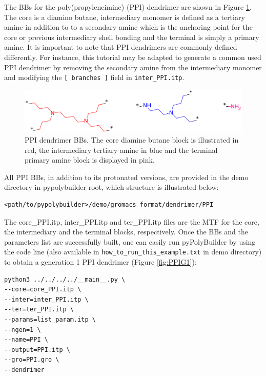 
The BBs for the poly(propyleneimine) (PPI) dendrimer are shown in Figure \ref{fig:PPIBB}.
The core is a diamino butane, intermediary monomer is defined as a tertiary amine in addition to to a secondary amine which is the anchoring point for the core or previous intermediary shell bonding and the terminal is simply a primary amine.
It is important to note that PPI dendrimers are commonly defined differently.
For instance, this tutorial may be adapted to generate a common used PPI dendrimer by removing the secondary amine from the intermediary monomer and modifying the \texttt{[ branches ]} field in \texttt{inter\_PPI.itp}.

\begin{figure}
    \centering
    \includegraphics[width=\textwidth]{PPI/PPIBBs.png}
    \caption{PPI dendrimer BBs.
             The core diamine butane block is illustrated in red, the intermediary tertiary amine in blue and the terminal primary amine block is displayed in pink.}
    \label{fig:PPIBB}
\end{figure}

All PPI BBs, in addition to its protonated versions, are provided in the demo directory in pypolybuilder root, which structure is illustrated below:
\begin{lstlisting}
<path/to/pypolybuilder>/demo/gromacs_format/dendrimer/PPI
\end{lstlisting}

The core\_PPI.itp, inter\_PPI.itp and ter\_PPI.itp files are the MTF for the core, the intermediary and the terminal blocks, respectively.
Once the BBs and the parameters list are successfully built, one can easily run pyPolyBuilder by using the code line (also available in \texttt{how\_to\_run\_this\_example.txt} in demo directory) to obtain a generation 1 PPI dendrimer (Figure \ref{fig:PPIG1}):

\begin{lstlisting}
python3 ../../../../__main__.py \
--core=core_PPI.itp \
--inter=inter_PPI.itp \
--ter=ter_PPI.itp \
--params=list_param.itp \
--ngen=1 \
--name=PPI \
--output=PPI.itp \
--gro=PPI.gro \
--dendrimer
\end{lstlisting}

